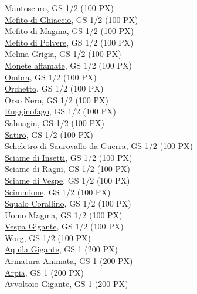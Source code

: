 \begin{multicols}{3}
{\hyperlink{Mantoscuro}{Mantoscuro}, GS 1/2 (100 PX)\\
\hyperlink{Mefito di Ghiaccio}{Mefito di Ghiaccio}, GS 1/2 (100 PX)\\
\hyperlink{Mefito di Magma}{Mefito di Magma}, GS 1/2 (100 PX)\\
\hyperlink{Mefito di Polvere}{Mefito di Polvere}, GS 1/2 (100 PX)\\
\hyperlink{Melma Grigia}{Melma Grigia}, GS 1/2 (100 PX)\\
\hyperlink{Monete affamate}{Monete affamate}, GS 1/2 (100 PX)\\
\hyperlink{Ombra}{Ombra}, GS 1/2 (100 PX)\\
\hyperlink{Orchetto}{Orchetto}, GS 1/2 (100 PX)\\
\hyperlink{Orso Nero}{Orso Nero}, GS 1/2 (100 PX)\\
\hyperlink{Rugginofago}{Rugginofago}, GS 1/2 (100 PX)\\
\hyperlink{Sahuagin}{Sahuagin}, GS 1/2 (100 PX)\\
\hyperlink{Satiro}{Satiro}, GS 1/2 (100 PX)\\
\hyperlink{Scheletro di Saurovallo da Guerra}{Scheletro di Saurovallo da Guerra}, GS 1/2 (100 PX)\\
\hyperlink{Sciame di Insetti}{Sciame di Insetti}, GS 1/2 (100 PX)\\
\hyperlink{Sciame di Ragni}{Sciame di Ragni}, GS 1/2 (100 PX)\\
\hyperlink{Sciame di Vespe}{Sciame di Vespe}, GS 1/2 (100 PX)\\
\hyperlink{Scimmione}{Scimmione}, GS 1/2 (100 PX)\\
\hyperlink{Squalo Corallino}{Squalo Corallino}, GS 1/2 (100 PX)\\
\hyperlink{Uomo Magma}{Uomo Magma}, GS 1/2 (100 PX)\\
\hyperlink{Vespa Gigante}{Vespa Gigante}, GS 1/2 (100 PX)\\
\hyperlink{Worg}{Worg}, GS 1/2 (100 PX)\\
\hyperlink{Aquila Gigante}{Aquila Gigante}, GS 1 (200 PX)\\
\hyperlink{Armatura Animata}{Armatura Animata}, GS 1 (200 PX)\\
\hyperlink{Arpia}{Arpia}, GS 1 (200 PX)\\
\hyperlink{Avvoltoio Gigante}{Avvoltoio Gigante}, GS 1 (200 PX)\\
}
\end{multicols}
